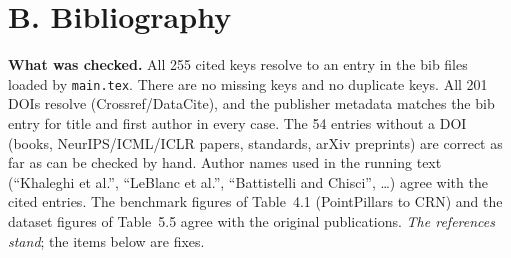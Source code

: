 \documentclass[10pt,a4paper]{article}
\begin{document}
\section*{B. Bibliography}
\textbf{What was checked.} All 255 cited keys resolve to an entry in the bib files loaded by \texttt{main.tex}. There are no missing keys and no duplicate keys. All 201 DOIs resolve (Crossref/DataCite), and the publisher metadata matches the bib entry for title and first author in every case. The 54 entries without a DOI (books, NeurIPS/ICML/ICLR papers, standards, arXiv preprints) are correct as far as can be checked by hand. Author names used in the running text (``Khaleghi et al.'', ``LeBlanc et al.'', ``Battistelli and Chisci'', \ldots) agree with the cited entries. The benchmark figures of Table~4.1 (PointPillars to CRN) and the dataset figures of Table~5.5 agree with the original publications. \emph{The references stand}; the items below are fixes.
\end{document}
